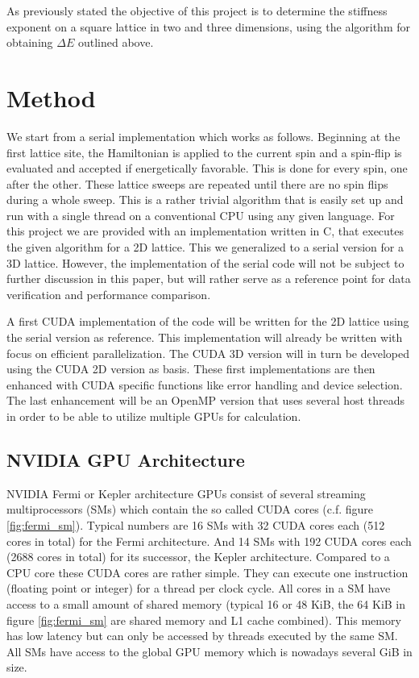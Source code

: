\documentclass[paper=a4, fontsize=11pt]{scrartcl} %
\numberwithin{equation}{section} %
\numberwithin{figure}{section} %
\numberwithin{table}{section} %
\begin{document}
As previously stated the objective of this project is to determine the stiffness exponent on a square lattice in two and three dimensions, using the algorithm for obtaining $\Delta E$ outlined above.

\section{Method}
\label{sec:method}
We start from a serial implementation which works as follows. Beginning at the first lattice site, the Hamiltonian is applied to the current spin and a spin-flip is evaluated and accepted if energetically favorable. This is done for every spin, one after the other. These lattice sweeps are repeated until there are no spin flips during a whole sweep. This is a rather trivial algorithm that is easily set up and run with a single thread on a conventional CPU using any given language. For this project we are provided with an implementation written in C, that executes the given algorithm for a 2D lattice. This we generalized to a serial version for a 3D lattice. However, the implementation of the serial code will not be subject to further discussion in this paper, but will rather serve as a reference point for data verification and performance comparison.

A first CUDA implementation of the code will be written for the 2D lattice using the serial version as reference. This implementation will already be written with focus on efficient parallelization. The CUDA 3D version will in turn be developed using the CUDA 2D version as basis. These first implementations are then enhanced with CUDA specific functions like error handling and device selection. The last enhancement will be an OpenMP version that uses several host threads in order to be able to utilize multiple GPUs for calculation.

\subsection{NVIDIA GPU Architecture}
NVIDIA Fermi or Kepler architecture GPUs consist of several streaming multiprocessors (SMs) which contain the so called CUDA cores (c.f. figure \ref{fig:fermi_sm}). Typical numbers are 16 SMs with 32 CUDA cores each (512 cores in total) for the Fermi architecture. And 14 SMs with 192 CUDA cores each (2688 cores in total) for its successor, the Kepler architecture. Compared to a CPU core these CUDA cores are rather simple. They can execute one instruction (floating point or integer) for a thread per clock cycle. All cores in a SM have access to a small amount of shared memory (typical 16 or 48 KiB, the 64 KiB in figure \ref{fig:fermi_sm} are shared memory and L1 cache combined). This memory has low latency but can only be accessed by threads executed by the same SM. All SMs have access to the global GPU memory which is nowadays several GiB in size.
\end{document}
